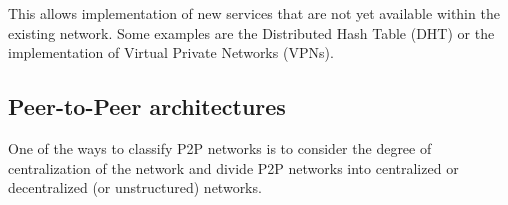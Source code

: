 This allows implementation of new services that are not yet available within the existing network. Some examples are the Distributed Hash Table (DHT) or the implementation of Virtual Private Networks (VPNs). 




\subsection{Peer-to-Peer architectures}
One of the ways to classify P2P networks is to consider the degree of centralization of the network and divide P2P networks into centralized or decentralized (or unstructured) networks.
\\

